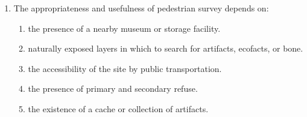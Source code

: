 \documentclass[12pt]{article}
\begin{document}
\begin{enumerate}[label=\arabic*.]
\begin{enumerate}[label=(\alph*)]
    \item pelagic; lacustrine
    \item pelagic; littoral
    \item pelagic; midden
    \item littoral; lacustrine
    \item midden; littoral
\end{enumerate}
\item The appropriateness and usefulness of pedestrian survey depends on:
\begin{enumerate}[label=(\alph*)]
    \item the presence of a nearby museum or storage facility.
    \item naturally exposed layers in which to search for artifacts, ecofacts, or bone.
    \item the accessibility of the site by public transportation.
    \item the presence of primary and secondary refuse.
    \item the existence of a cache or collection of artifacts.
\end{enumerate}
\end{enumerate}
\end{document}
